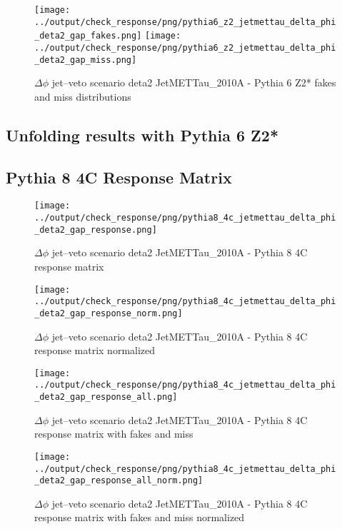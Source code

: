 \documentclass[11pt]{book}
\begin{document}
\begin{figure}[ht]
\centering
\texttt{[image: ../output/check\_response/png/pythia6\_z2\_jetmettau\_delta\_phi\_deta2\_gap\_fakes.png]}
\texttt{[image: ../output/check\_response/png/pythia6\_z2\_jetmettau\_delta\_phi\_deta2\_gap\_miss.png]}
\caption{$\Delta\phi$ jet--veto scenario deta2 JetMETTau\_2010A - Pythia 6 Z2* fakes and miss distributions}
\label{p6_jetmettau_delta_phi_deta2_gap_fakesmiss}
\end{figure}


\clearpage
\subsection{Unfolding results with Pythia 6 Z2*}


\clearpage
\subsection{Pythia 8 4C Response Matrix}


\begin{figure}[ht]
\centering
\texttt{[image: ../output/check\_response/png/pythia8\_4c\_jetmettau\_delta\_phi\_deta2\_gap\_response.png]}
\caption{$\Delta\phi$ jet--veto scenario deta2 JetMETTau\_2010A - Pythia 8 4C response matrix}
\label{p8_jetmettau_delta_phi_deta2_gap_response}
\end{figure}

\begin{figure}[ht]
\centering
\texttt{[image: ../output/check\_response/png/pythia8\_4c\_jetmettau\_delta\_phi\_deta2\_gap\_response\_norm.png]}
\caption{$\Delta\phi$ jet--veto scenario deta2 JetMETTau\_2010A - Pythia 8 4C response matrix normalized}
\label{p8_jetmettau_delta_phi_deta2_gap_response_norm}
\end{figure}

\begin{figure}[ht]
\centering
\texttt{[image: ../output/check\_response/png/pythia8\_4c\_jetmettau\_delta\_phi\_deta2\_gap\_response\_all.png]}
\caption{$\Delta\phi$ jet--veto scenario deta2 JetMETTau\_2010A - Pythia 8 4C response matrix with fakes and miss}
\label{p8_jetmettau_delta_phi_deta2_gap_response_all}
\end{figure}

\begin{figure}[ht]
\centering
\texttt{[image: ../output/check\_response/png/pythia8\_4c\_jetmettau\_delta\_phi\_deta2\_gap\_response\_all\_norm.png]}
\caption{$\Delta\phi$ jet--veto scenario deta2 JetMETTau\_2010A - Pythia 8 4C response matrix with fakes and miss normalized}
\label{p8_jetmettau_delta_phi_deta2_gap_response_all_norm}
\end{figure}
\end{document}
